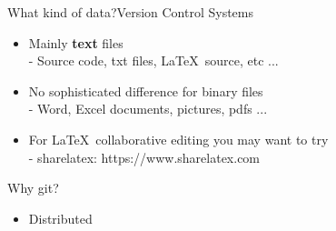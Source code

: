 \documentclass{beamer}
\begin{document}
\begin{frame}{What kind of data?}{Version Control Systems}
\begin{itemize}
  \setlength\itemsep{0.4in}
\item Mainly {\bf text} files\\
- Source code, txt files, \LaTeX\  source, etc ...
\item No sophisticated difference for binary files\\
- Word, Excel documents, pictures, pdfs ...
\item For \LaTeX\ collaborative editing you may want to try\\
- sharelatex: https://www.sharelatex.com
\end{itemize}
\end{frame}



\begin{frame}{Why git?}
\begin{itemize}
\item{Distributed}
\end{itemize}
\end{frame}
\end{document}
